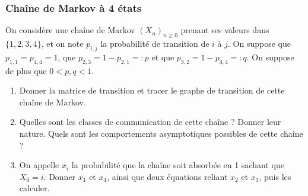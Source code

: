 \subsubsection{Chaîne de Markov à 4 états}

On considère une chaîne de Markov $(X_n)_{n \geq 0}$ prenant ses valeurs dans $\{1, 2, 3, 4\}$, et on note $p_{i, j}$ la probabilité de transition de $i$ à $j$. On suppose que $p_{1, 1} = p_{4, 4} = 1$, que $p_{2, 3} = 1 - p_{2, 1} =: p$ et que $p_{3, 2} = 1 - p_{3, 4} =: q$. On suppose de plus que $0 < p, q < 1$.
\begin{enumerate}
  \item Donner la matrice de transition  et tracer le graphe de transition de cette chaîne de Markov.
  \item Quelles sont les classes de communication de cette chaîne ? Donner leur nature. Quels sont les comportements asymptotiques possibles de cette chaîne ?
  \item On appelle $x_i$ la probabilité que la chaîne soit absorbée en 1 sachant que $X_0 = i$. Donner $x_1$ et $x_4$, ainsi que deux équations reliant $x_2$ et $x_3$, puis les calculer.
\end{enumerate}
